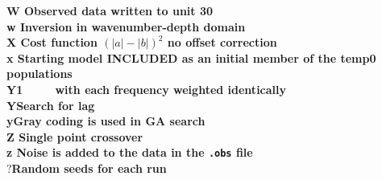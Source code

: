 \begin{tabbing}
\bf W\> Observed data written  to unit 30 \\
\bf w\> Inversion in wavenumber-depth domain\\
\bf X\> Cost function $(|a|-|b|)^2$ no offset correction\\ 
\bf x\> Starting model INCLUDED as an initial member of the temp0 populations\\ 
\bf Y1\>~~~~~with each frequency weighted identically\\
\bf Y\>Search for lag\\
\bf y\>Gray coding is used in GA search\\
\bf Z \>Single point crossover\\
\bf z \>Noise is added to the data in the {\tt *.obs} file\\ 
\bf $?$\>Random seeds for each run\\
\>\\
\end{tabbing}
